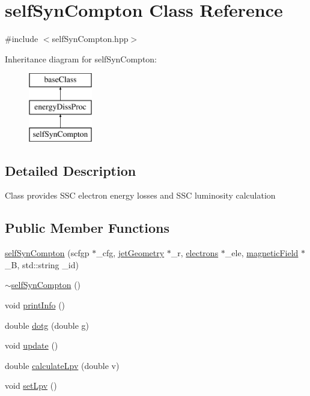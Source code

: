 \hypertarget{classselfSynCompton}{\section{self\-Syn\-Compton Class Reference}
\label{classselfSynCompton}
}


{\ttfamily \#include $<$self\-Syn\-Compton.\-hpp$>$}

Inheritance diagram for self\-Syn\-Compton\-:\begin{figure}[H]
\begin{center}
\leavevmode
\includegraphics[height=3.000000cm]{classselfSynCompton}
\end{center}
\end{figure}


\subsection{Detailed Description}
Class provides S\-S\-C electron energy losses and S\-S\-C luminosity calculation \subsection*{Public Member Functions}
\begin{DoxyCompactItemize}
\item 
\hyperlink{classselfSynCompton_a577dca084342cabf74de2765f0b187d0}{self\-Syn\-Compton} (scfgp $\ast$\-\_\-cfg, \hyperlink{classjetGeometry}{jet\-Geometry} $\ast$\-\_\-r, \hyperlink{classelectrons}{electrons} $\ast$\-\_\-ele, \hyperlink{classmagneticField}{magnetic\-Field} $\ast$\-\_\-\-B, std\-::string \-\_\-id)
\item 
\hyperlink{classselfSynCompton_adc3ac6dc66cc436b48d0a36ab26871fd}{$\sim$self\-Syn\-Compton} ()
\item 
void \hyperlink{classselfSynCompton_a46f692985a0fd74c14a018cc43f25c0b}{print\-Info} ()
\item 
double \hyperlink{classselfSynCompton_a51bad50f11e56a623b80e4436ef1b629}{dotg} (double g)
\item 
void \hyperlink{classselfSynCompton_af254f0dcd2abfe1d218c85d917992e24}{update} ()
\item 
double \hyperlink{classselfSynCompton_a39e8b6e7b4094f39f9436cd94a15775e}{calculate\-Lpv} (double v)
\item 
void \hyperlink{classselfSynCompton_ae34a13d5ddf894d3e1ede229ffb4176a}{set\-Lpv} ()
\end{DoxyCompactItemize}
